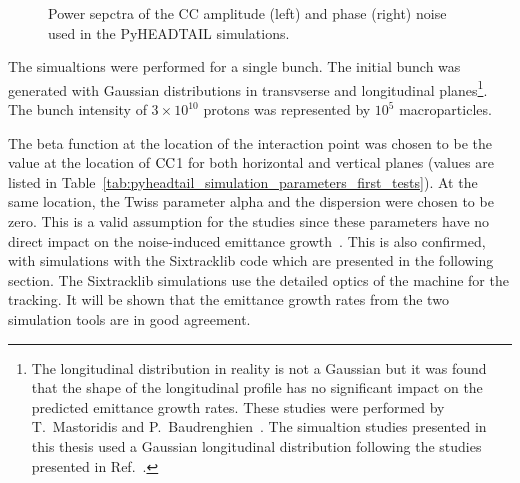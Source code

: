 \begin{figure}[htp]
\begin{subfigure}{.45\textwidth}
    \end{subfigure}
    \caption{Power sepctra of the CC amplitude (left) and phase (right) noise used in the PyHEADTAIL simulations.}
    \label{fig:psd_cc_simulations_example}
\end{figure}

The simualtions were performed for a single bunch. The initial bunch was generated with Gaussian distributions in transvserse and longitudinal planes\footnote{The longitudinal distribution in reality is not a Gaussian but it was found that the shape of the longitudinal profile has no significant impact on the predicted emittance growth rates. These studies were performed by T.~Mastoridis and P.~Baudrenghien~\cite{Themis_philippe_personal_communication}. The simualtion studies presented in this thesis used a Gaussian longitudinal distribution following the studies presented in Ref.~\cite{PhysRevSTAB.18.101001}.}.
The bunch intensity of $3\times 10^{10}$ protons was represented by $10^5$ macroparticles. 

The beta function at the location of the interaction point was chosen to be the value at the location of ${\mathrm{CC}}$1 for both horizontal and vertical planes (values are listed in Table~\ref{tab:pyheadtail_simulation_parameters_first_tests}). At the same location, the Twiss parameter alpha and the dispersion were chosen to be zero. This is a valid assumption for the studies since these parameters have no direct impact on the noise-induced emittance growth~\cite{PhysRevSTAB.18.101001}. %
This is also confirmed, with simulations with the Sixtracklib code which are presented in the following section. The Sixtracklib simulations use the detailed optics of the machine for the tracking. It will be shown that the emittance growth rates from the two simulation tools are in good agreement.

